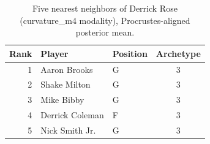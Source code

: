 \begin{table}[htbp]
  \centering\small
  \begin{tabular}{rllc}
    \toprule
    Rank & Player & Position & Archetype \\
    \midrule
    1 & Aaron Brooks & G & 3 \\
    2 & Shake Milton & G & 3 \\
    3 & Mike Bibby & G & 3 \\
    4 & Derrick Coleman & F & 3 \\
    5 & Nick Smith Jr. & G & 3 \\
    \bottomrule
  \end{tabular}
  \caption{Five nearest neighbors of Derrick Rose (curvature_m4 modality), Procrustes-aligned posterior mean.}
  \label{tab:Derrick_Rose_neighbors_curvature_m4}
\end{table}

